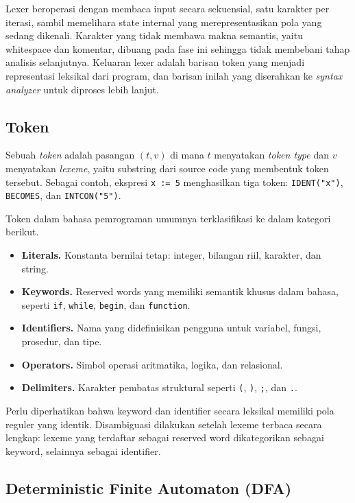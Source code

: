 \documentclass[11pt,a4paper]{article}
\begin{document}
Lexer beroperasi dengan membaca input secara sekuensial, satu karakter per iterasi,
sambil memelihara state internal yang merepresentasikan pola yang sedang dikenali.
Karakter yang tidak membawa makna semantis, yaitu whitespace dan komentar, dibuang
pada fase ini sehingga tidak membebani tahap analisis selanjutnya.
Keluaran lexer adalah barisan token yang menjadi representasi leksikal dari program,
dan barisan inilah yang diserahkan ke \textit{syntax analyzer} untuk diproses lebih lanjut.

\subsection{Token}

Sebuah \textit{token} adalah pasangan $(t, v)$ di mana $t$ menyatakan \textit{token type}
dan $v$ menyatakan \textit{lexeme}, yaitu substring dari source code yang membentuk token tersebut.
Sebagai contoh, ekspresi \texttt{x := 5} menghasilkan tiga token:
\texttt{IDENT("x")}, \texttt{BECOMES}, dan \texttt{INTCON("5")}.

Token dalam bahasa pemrograman umumnya terklasifikasi ke dalam kategori berikut.

\begin{itemize}
    \item \textbf{Literals.} Konstanta bernilai tetap: integer, bilangan riil, karakter, dan string.
    \item \textbf{Keywords.} Reserved words yang memiliki semantik khusus dalam bahasa,
          seperti \texttt{if}, \texttt{while}, \texttt{begin}, dan \texttt{function}.
    \item \textbf{Identifiers.} Nama yang didefinisikan pengguna untuk variabel,
          fungsi, prosedur, dan tipe.
    \item \textbf{Operators.} Simbol operasi aritmatika, logika, dan relasional.
    \item \textbf{Delimiters.} Karakter pembatas struktural seperti \texttt{(},
          \texttt{)}, \texttt{;}, dan \texttt{.}.
\end{itemize}

Perlu diperhatikan bahwa keyword dan identifier secara leksikal memiliki pola reguler
yang identik. Disambiguasi dilakukan setelah lexeme terbaca secara lengkap: lexeme
yang terdaftar sebagai reserved word dikategorikan sebagai keyword, selainnya sebagai identifier.

\subsection{Deterministic Finite Automaton (DFA)}
\end{document}
